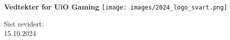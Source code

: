 \begin{titlepage}
\begin{center}
    \vspace*{1cm}

    \Huge
    \textbf{Vedtekter for UiO Gaming}
    \vspace{1cm}
    \vspace{3cm}
    \texttt{[image: images/2024\_logo\_svart.png]}
    \vspace{7cm}

    \LARGE
    Sist revidert:\\
    15.10.2024
\end{center}
\end{titlepage}
